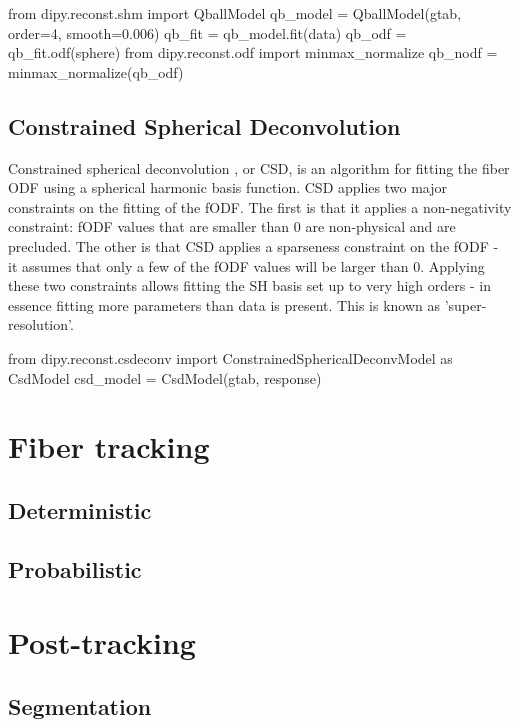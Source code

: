 \documentclass{bioinfo}
\begin{document}
\begin{python}
from dipy.reconst.shm import QballModel
qb_model = QballModel(gtab, order=4, smooth=0.006)
qb_fit = qb_model.fit(data)
qb_odf = qb_fit.odf(sphere)
from dipy.reconst.odf import minmax_normalize
qb_nodf = minmax_normalize(qb_odf)
\end{python}


\subsection{Constrained Spherical Deconvolution}

Constrained spherical deconvolution \citep{tournier-calamante-etal:07}, or CSD, is an algorithm for fitting the fiber ODF using a spherical harmonic basis function.  CSD applies two major constraints on the fitting of the fODF. The first is that it applies a non-negativity constraint: fODF values that are smaller than 0 are non-physical and are precluded. The other is that CSD applies a sparseness constraint on the fODF - it assumes that only a few of the fODF values will be larger than 0. Applying these two constraints allows fitting the SH basis set up to very high orders - in essence fitting more parameters than data is present. This is known as 'super-resolution'.

\begin{python}
from dipy.reconst.csdeconv import
        ConstrainedSphericalDeconvModel as CsdModel
csd_model = CsdModel(gtab, response)
\end{python}

\section{Fiber tracking}

\subsection{Deterministic}

\subsection{Probabilistic}

\section{Post-tracking}

\subsection{Segmentation}
\end{document}
